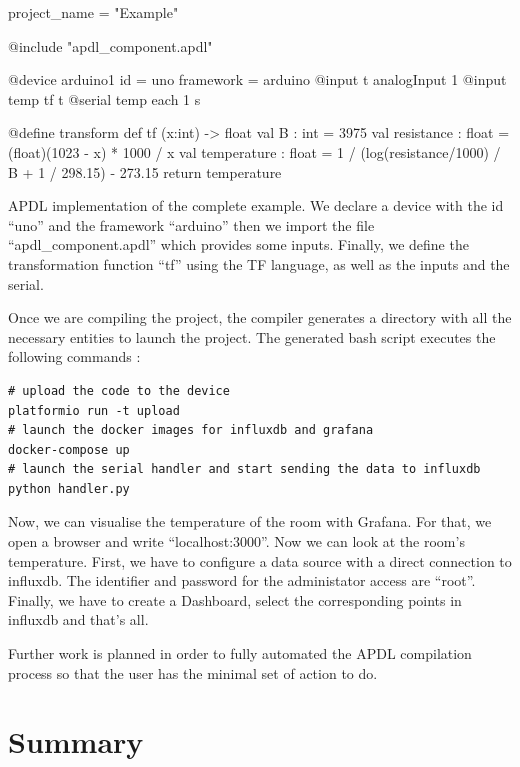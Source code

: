 \begin{listing}[H]
  \centering
\begin{apdlcode}
project_name = "Example"

@include "apdl_component.apdl"

@device arduino1 {
    id = uno
    framework = arduino
    @input t analogInput 1
    @input temp tf t
    @serial temp each 1 s
}

@define transform def tf (x:int) -> float {
    val B : int = 3975
    val resistance : float = (float)(1023 - x) * 1000 / x
    val temperature : float = 1 / (log(resistance/1000) / B + 1 / 298.15) - 273.15
    return temperature
}
\end{apdlcode}
  \caption[APDL implementation of the complete example]{APDL implementation of
the complete example. We declare a device with the id ``uno'' and the framework
``arduino'' then we import the file ``apdl\_component.apdl'' which provides some
inputs. Finally, we define the transformation function ``tf'' using the \gls{TF}
language, as well as the inputs and the serial.}
  \label{lst:demo_code}
\end{listing}

Once we are compiling the project, the compiler generates a directory with all
the necessary entities to launch the project. The generated bash script executes
the following commands :

\begin{verbatim}
# upload the code to the device
platformio run -t upload
# launch the docker images for influxdb and grafana
docker-compose up
# launch the serial handler and start sending the data to influxdb
python handler.py
\end{verbatim}

Now, we can visualise the temperature of the room with Grafana. For that, we open a
browser and write ``localhost:3000''. Now we can look at the room's temperature.
First, we have to configure a data source with a direct connection to influxdb.
The identifier and password for the administator access are ``root''. Finally,
we have to create a Dashboard, select the corresponding points in influxdb and
that's all.

Further work is planned in order to fully automated the \gls{APDL} compilation
process so that the user has the minimal set of action to do.

\section{Summary}
\label{sec:apdl_ecosystem_summary}

